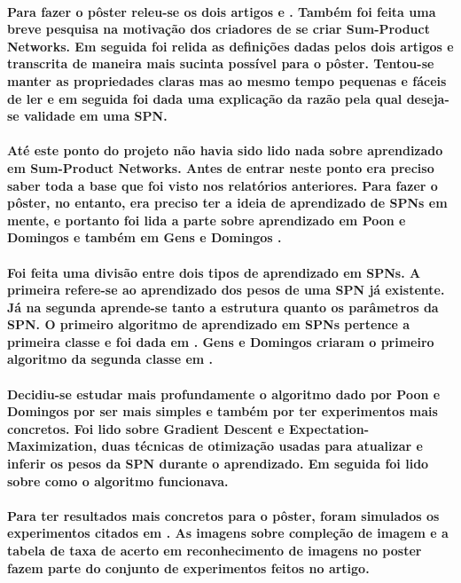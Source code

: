 \documentclass[a4paper,10pt]{article}
\theoremstyle{plain}
\begin{document}
\paragraph{
  Para fazer o pôster releu-se os dois artigos \cite{poon-domingos} e \cite{gens-domingos}. Também
  foi feita uma breve pesquisa na motivação dos criadores de se criar Sum-Product Networks. Em
  seguida foi relida as definições dadas pelos dois artigos e transcrita de maneira mais sucinta
  possível para o pôster. Tentou-se manter as propriedades claras mas ao mesmo tempo pequenas e
  fáceis de ler e em seguida foi dada uma explicação da razão pela qual deseja-se validade em uma
  SPN.
}

\paragraph{
  Até este ponto do projeto não havia sido lido nada sobre aprendizado em Sum-Product Networks.
  Antes de entrar neste ponto era preciso saber toda a base que foi visto nos relatórios
  anteriores. Para fazer o pôster, no entanto, era preciso ter a ideia de aprendizado de SPNs em
  mente, e portanto foi lida a parte sobre aprendizado em Poon e Domingos \cite{poon-domingos} e
  também em Gens e Domingos \cite{gens-domingos}.
}

\paragraph{
  Foi feita uma divisão entre dois tipos de aprendizado em SPNs. A primeira refere-se ao
  aprendizado dos pesos de uma SPN já existente. Já na segunda aprende-se tanto a estrutura quanto
  os parâmetros da SPN. O primeiro algoritmo de aprendizado em SPNs pertence a primeira classe e
  foi dada em \cite{poon-domingos}. Gens e Domingos criaram o primeiro algoritmo da segunda classe
  em \cite{gens-domingos}.
}

\paragraph{
  Decidiu-se estudar mais profundamente o algoritmo dado por Poon e Domingos por ser mais simples
  e também por ter experimentos mais concretos. Foi lido sobre Gradient Descent e
  Expectation-Maximization, duas técnicas de otimização usadas para atualizar e inferir os pesos
  da SPN durante o aprendizado. Em seguida foi lido sobre como o algoritmo funcionava.
}

\paragraph{
  Para ter resultados mais concretos para o pôster, foram simulados os experimentos citados em
  \cite{poon-domingos}. As imagens sobre compleção de imagem e a tabela de taxa de acerto em
  reconhecimento de imagens no poster fazem parte do conjunto de experimentos feitos no artigo.
}
\end{document}
